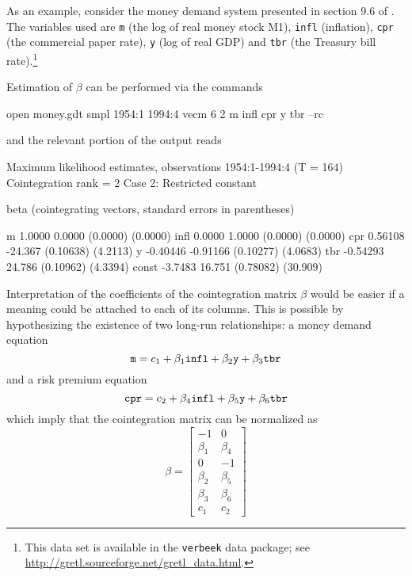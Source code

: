 As an example, consider the money demand system presented in section
9.6 of \cite{verbeek04}.  The variables used are \texttt{m} (the log of
real money stock M1), \texttt{infl} (inflation), \texttt{cpr} (the
commercial paper rate), \texttt{y} (log of real GDP) and \texttt{tbr}
(the Treasury bill rate).\footnote{This data set is available in the
  \texttt{verbeek} data package; see
  \url{http://gretl.sourceforge.net/gretl_data.html}.}

Estimation of $\beta$ can be performed via the commands
\begin{code}
open money.gdt 
smpl 1954:1 1994:4 
vecm 6 2 m infl cpr y tbr --rc
\end{code}
and the relevant portion of the output reads
\begin{code}
Maximum likelihood estimates, observations 1954:1-1994:4 (T = 164)
Cointegration rank = 2
Case 2: Restricted constant

beta (cointegrating vectors, standard errors in parentheses)

m           1.0000       0.0000 
           (0.0000)     (0.0000) 
infl        0.0000       1.0000 
           (0.0000)     (0.0000) 
cpr        0.56108      -24.367 
          (0.10638)     (4.2113) 
y         -0.40446     -0.91166 
          (0.10277)     (4.0683) 
tbr       -0.54293       24.786 
          (0.10962)     (4.3394) 
const      -3.7483       16.751 
          (0.78082)     (30.909) 
\end{code}
%
Interpretation of the coefficients of the cointegration matrix $\beta$
would be easier if a meaning could be attached to each of its
columns. This is possible by hypothesizing the existence of two
long-run relationships: a money demand equation
\[
  \mbox{\tt m} = c_1 + \beta_1 \mbox{\tt infl} + \beta_2 \mbox{\tt
    y} + \beta_3 \mbox{\tt tbr}
\]
and a risk premium equation
\[
 \mbox{\tt cpr} = c_2 + \beta_4 \mbox{\tt infl} +
   \beta_5 \mbox{\tt y} + \beta_6 \mbox{\tt tbr}
\]
which imply that the cointegration matrix can be normalized as
\[
  \beta = \left[
    \begin{array}{rr}
      -1 & 0 \\ \beta_1 & \beta_4 \\ 0 & -1 \\ \beta_2 & \beta_5
      \\ \beta_3 & \beta_6 \\ c_1 & c_2
    \end{array}
    \right]
\]

